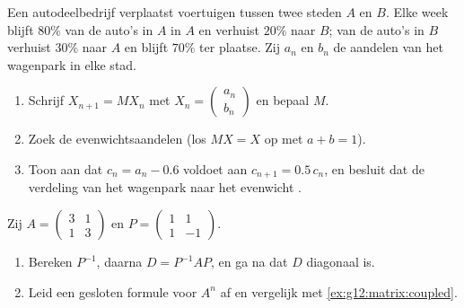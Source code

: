 \begin{exercise}[$\star\star$]\label{exo:g12:matrix:7}
Een autodeelbedrijf verplaatst voertuigen tussen twee steden $A$ en $B$. Elke
week blijft $80\%$ van de auto's in $A$ in $A$ en verhuist $20\%$ naar $B$;
van de auto's in $B$ verhuist $30\%$ naar $A$ en blijft $70\%$ ter plaatse.
Zij $a_n$ en $b_n$ de aandelen van het wagenpark in elke stad.
\begin{omfigure}
\end{omfigure}
\begin{enumerate}
  \item Schrijf $X_{n+1} = MX_n$ met
        $X_n = \begin{pmatrix} a_n\\ b_n\end{pmatrix}$ en bepaal $M$.
  \item Zoek de evenwichtsaandelen (los $MX = X$ op met $a + b = 1$).
  \item Toon aan dat $c_n = a_n - 0.6$ voldoet aan $c_{n+1} = 0.5\,c_n$, en
        besluit dat de verdeling van het wagenpark naar het evenwicht
        .
\end{enumerate}
\end{exercise}

\begin{exercise}[$\star\star\star$]\label{exo:g12:matrix:8}
Zij $A = \begin{pmatrix} 3 & 1\\ 1 & 3 \end{pmatrix}$ en
$P = \begin{pmatrix} 1 & 1\\ 1 & -1 \end{pmatrix}$.
\begin{enumerate}
  \item Bereken $P^{-1}$, daarna $D = P^{-1}AP$, en ga na dat $D$ diagonaal
        is.
  \item Leid een gesloten formule voor $A^n$ af en vergelijk met
        \cref{ex:g12:matrix:coupled}.
\end{enumerate}
\end{exercise}

